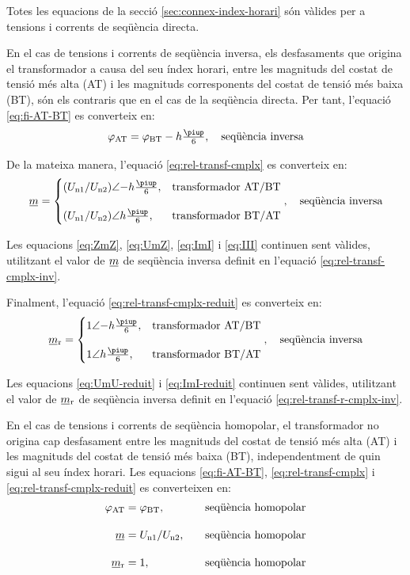 Totes les equacions de la secció \ref{sec:connex-index-horari} són vàlides per a tensions i corrents de seqüència directa.

En el cas de tensions i corrents de seqüència inversa, els desfasaments que origina el transformador a causa del seu índex horari, entre les magnituds  del costat de tensió més alta (AT) i les magnituds corresponents del costat de tensió més baixa (BT), són els contraris que en el cas de la seqüència directa. Per tant, l'equació  \eqref{eq:fi-AT-BT} es converteix en:
\begin{equation}
    \varphi\ped{AT} = \varphi\ped{BT} - h\tfrac{\piup}{6}, \quad\text{seqüència inversa}
\end{equation}

De la mateixa manera, l'equació \eqref{eq:rel-transf-cmplx} es converteix en:
\begin{equation}\label{eq:rel-transf-cmplx-inv}
\cmplx{m} = \begin{cases}
     (U\ped{n1}/U\ped{n2})\angle{-h} \frac{\piup}{6}, & \text{transformador AT/BT}\\[2.7ex]
     (U\ped{n1}/U\ped{n2})\angle h \frac{\piup}{6}, & \text{transformador BT/AT}
\end{cases},
\quad\text{seqüència inversa}
\end{equation}

Les equacions \eqref{eq:ZmZ}, \eqref{eq:UmZ}, \eqref{eq:ImI} i \eqref{eq:III} continuen sent vàlides, utilitzant el valor de $\cmplx{m}$ de seqüència inversa definit en l'equació \eqref{eq:rel-transf-cmplx-inv}.

Finalment, l'equació \eqref{eq:rel-transf-cmplx-reduit} es converteix en:
\begin{equation}\label{eq:rel-transf-r-cmplx-inv}
\cmplx{m}\ped{r}  = 
\begin{cases}
      1\angle{-h}\frac{\piup}{6}, & \text{transformador AT/BT}\\[2.7ex]
      1\angle h\frac{\piup}{6}, & \text{transformador BT/AT}
\end{cases},
\quad\text{seqüència inversa}
\end{equation}

Les equacions \eqref{eq:UmU-reduit} i \eqref{eq:ImI-reduit} continuen sent vàlides, utilitzant el valor de $\cmplx{m}\ped{r}$ de seqüència inversa definit en l'equació \eqref{eq:rel-transf-r-cmplx-inv}.

En el cas de tensions i corrents de seqüència homopolar, el transformador no  origina cap desfasament entre les magnituds  del costat de tensió més alta (AT) i les magnituds del costat de tensió més baixa (BT), independentment de quin sigui al seu índex horari. Les equacions \eqref{eq:fi-AT-BT}, \eqref{eq:rel-transf-cmplx} i \eqref{eq:rel-transf-cmplx-reduit} es converteixen en:
\begin{alignat}{3}
  \varphi\ped{AT} &= \varphi\ped{BT}, &&\quad\text{seqüència homopolar} \\[1em]
  \cmplx{m} &= U\ped{n1}/U\ped{n2}, &&\quad\text{seqüència homopolar}\label{eq:rel-transf-cmplx-hom} \\[1em]
  \cmplx{m}\ped{r} &= 1, &&\quad\text{seqüència homopolar}
\end{alignat}

